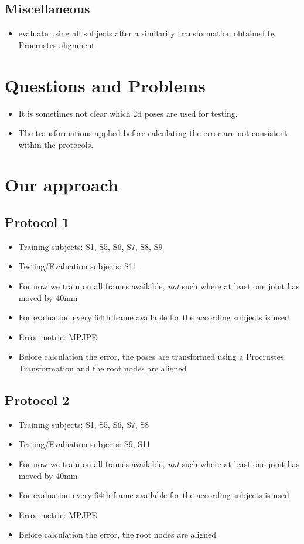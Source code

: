 \documentclass[11pt]{article}
\begin{document}
	\subsection{Miscellaneous}
	\begin{itemize}
		\item \cite{jahangiri17} evaluate using all subjects after a similarity transformation obtained by Procrustes alignment
	\end{itemize}
	
	\section{Questions and Problems}
	\begin{itemize}
		\item It is sometimes not clear which 2d poses are used for testing.
		\item The transformations applied before calculating the error are not consistent within the protocols.
	\end{itemize}
	
	
	\section{Our approach}
		\subsection{Protocol 1}
			\begin{itemize}
				\item Training subjects: S1, S5, S6, S7, S8, S9
				\item Testing/Evaluation subjects: S11
				\item For now we train on all frames available, \emph{not} such where at least one joint has moved by 40mm
				\item For evaluation every 64th frame available for the according subjects is used
				\item Error metric: MPJPE
				\item Before calculation the error, the poses are transformed using a Procrustes Transformation and the root nodes are aligned
			\end{itemize}
		\subsection{Protocol 2}
			\begin{itemize}
				\item Training subjects: S1, S5, S6, S7, S8
				\item Testing/Evaluation subjects: S9, S11
				\item For now we train on all frames available, \emph{not} such where at least one joint has moved by 40mm
				\item For evaluation every 64th frame available for the according subjects is used
				\item Error metric: MPJPE
				\item Before calculation the error, the root nodes are aligned
			\end{itemize}
	
  
  
  
\end{document}
